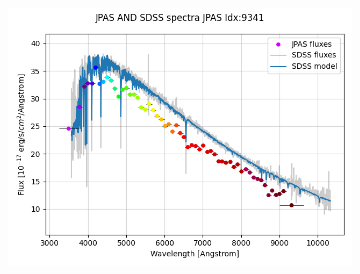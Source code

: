\documentclass{beamer}
\begin{document}
\begin{frame}
\begin{figure}
\begin{subfigure}{0.3\linewidth}
            \includegraphics[width=1.0\textwidth]{../../figs/spec/jpas_sdss_9341.png}
        \end{subfigure}
        

\end{figure}
\end{frame}
\end{document}
